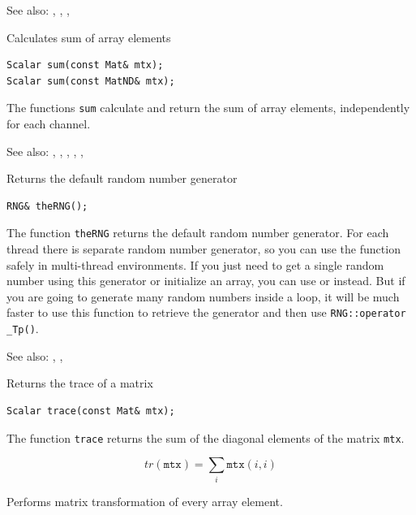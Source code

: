 See also: , , , 

\label{sum}
Calculates sum of array elements

\begin{lstlisting}
Scalar sum(const Mat& mtx);
Scalar sum(const MatND& mtx);
\end{lstlisting}
\begin{description}
\end{description}

The functions \texttt{sum} calculate and return the sum of array elements, independently for each channel.

See also: , , , , , 

\label{theRNG}
Returns the default random number generator

\begin{lstlisting}
RNG& theRNG();
\end{lstlisting}

The function \texttt{theRNG} returns the default random number generator. For each thread there is separate random number generator, so you can use the function safely in multi-thread environments. If you just need to get a single random number using this generator or initialize an array, you can use  or  instead. But if you are going to generate many random numbers inside a loop, it will be much faster to use this function to retrieve the generator and then use \texttt{RNG::operator \_Tp()}.

See also: , , 

\label{trace}
Returns the trace of a matrix

\begin{lstlisting}
Scalar trace(const Mat& mtx);
\end{lstlisting}
\begin{description}
\end{description}

The function \texttt{trace} returns the sum of the diagonal elements of the matrix \texttt{mtx}.

\[ tr(\texttt{mtx}) = \sum_i \texttt{mtx}(i,i) \]


\label{transform}
Performs matrix transformation of every array element.

